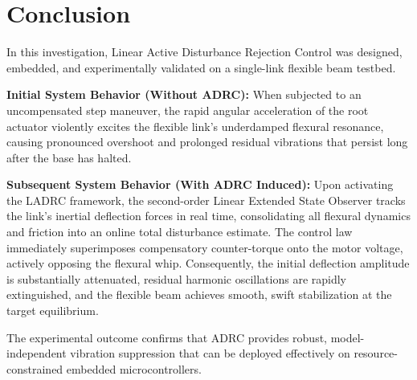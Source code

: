 \documentclass[conference]{IEEEtran}
\begin{document}
\section{Conclusion}
In this investigation, Linear Active Disturbance Rejection Control was designed, embedded, and experimentally validated on a single-link flexible beam testbed. 

\textbf{Initial System Behavior (Without ADRC):}  
When subjected to an uncompensated step maneuver, the rapid angular acceleration of the root actuator violently excites the flexible link's underdamped flexural resonance, causing pronounced overshoot and prolonged residual vibrations that persist long after the base has halted.

\textbf{Subsequent System Behavior (With ADRC Induced):}  
Upon activating the LADRC framework, the second-order Linear Extended State Observer tracks the link's inertial deflection forces in real time, consolidating all flexural dynamics and friction into an online total disturbance estimate. The control law immediately superimposes compensatory counter-torque onto the motor voltage, actively opposing the flexural whip. Consequently, the initial deflection amplitude is substantially attenuated, residual harmonic oscillations are rapidly extinguished, and the flexible beam achieves smooth, swift stabilization at the target equilibrium.

The experimental outcome confirms that ADRC provides robust, model-independent vibration suppression that can be deployed effectively on resource-constrained embedded microcontrollers.
\end{document}
